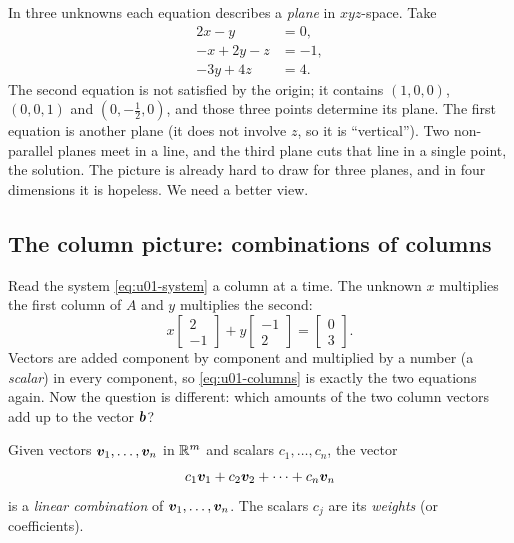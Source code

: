 In three unknowns each equation describes a \emph{plane} in $xyz$-space. Take
\begin{equation}\label{eq:u01-three}
\begin{aligned}
  2x - y \phantom{{}-z} &= 0,\\
  -x + 2y - z &= -1,\\
  -3y + 4z &= 4 .
\end{aligned}
\end{equation}
The second equation is not satisfied by the origin; it contains $(1,0,0)$, $(0,0,1)$ and
$(0,-\tfrac12,0)$, and those three points determine its plane. The first equation is another
plane (it does not involve $z$, so it is ``vertical''). Two non-parallel planes meet in a
line, and the third plane cuts that line in a single point, the solution. The picture is
already hard to draw for three planes, and in four dimensions it is hopeless. We need a
better view.

\subsection{The column picture: combinations of columns}

Read the system \eqref{eq:u01-system} a column at a time. The unknown $x$ multiplies the
first column of $A$ and $y$ multiplies the second:
\begin{equation}\label{eq:u01-columns}
  x\begin{bmatrix} 2\\ -1\end{bmatrix} + y\begin{bmatrix} -1\\ 2\end{bmatrix}
  = \begin{bmatrix} 0\\ 3\end{bmatrix}.
\end{equation}
Vectors are added component by component and multiplied by a number (a \emph{scalar}) in
every component, so \eqref{eq:u01-columns} is exactly the two equations again. Now the question
is different: which amounts of the two column vectors add up to the vector $\boldsymbol{b}$?

\begin{definition}\label{def:u01-combination}
Given vectors $\boldsymbol{v}_1,\dots,\boldsymbol{v}_n$ in $\mathbb{R}^m$ and scalars $c_1,\dots,c_n$, the vector
\[
  c_1\boldsymbol{v}_1 + c_2\boldsymbol{v}_2 + \cdots + c_n\boldsymbol{v}_n
\]
is a \emph{linear combination} of $\boldsymbol{v}_1,\dots,\boldsymbol{v}_n$. The scalars $c_j$ are its
\emph{weights} (or coefficients).
\end{definition}

